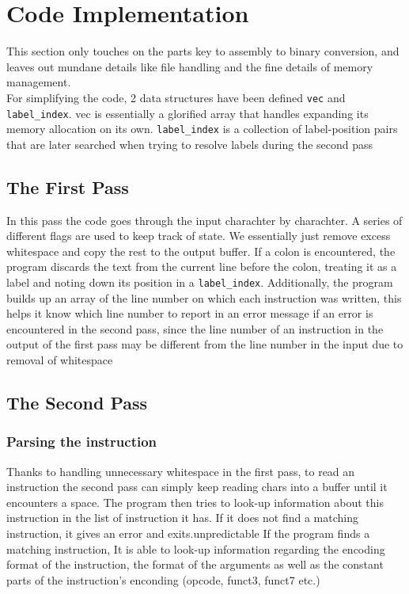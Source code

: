 \documentclass[12pt]{article}
\begin{document}
	\section{Code Implementation}

		This section only touches on the parts key to assembly to binary conversion, and leaves out mundane details like file handling and the fine details of memory management.\\
		For simplifying the code, 2 data structures have been defined \verb|vec| and \verb|label_index|. vec is essentially a glorified array that handles expanding its memory allocation on its own. \verb|label_index| is a collection of label-position pairs that are later searched when trying to resolve labels during the second pass

		\subsection{The First Pass}

			In this pass the code goes through the input charachter by charachter. A series of different flags are used to keep track of state.
			We essentially just remove excess whitespace and copy the rest to the output buffer. If a colon is encountered, the program discards the text from the current line before the colon, treating it as a label and noting down its position in a \verb|label_index|.
			Additionally, the program builds up an array of the line number on which each instruction was written, this helps it know which line number to report in an error message if an error is encountered in the second pass, since the line number of an instruction in the output of the first pass may be different from the line number in the input due to removal of whitespace
				
		\subsection{The Second Pass}

			\subsubsection{Parsing the instruction} \label{instruction_parse}
			Thanks to handling unnecessary whitespace in the first pass, to read an instruction the second pass can simply keep reading chars into a buffer until it encounters a space.
			The program then tries to look-up information about this instruction in the list of instruction it has. If it does not find a matching instruction, it gives an error and exits.unpredictable
			If the program finds a matching instruction, It is able to look-up information regarding the encoding format of the instruction, the format of the arguments as well as the constant parts of the instruction's enconding (opcode, funct3, funct7 etc.)
\end{document}
